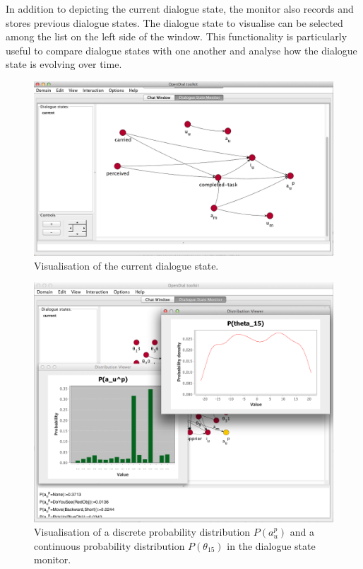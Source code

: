 In addition to depicting the current dialogue state, the monitor also records and stores previous dialogue states.  The dialogue state to visualise can be selected among the list on the left side of the window. This functionality is particularly useful to compare dialogue states with one another and analyse how the dialogue state is evolving over time. 

\begin{figure}[p!] 
\begin{center}
\includegraphics[scale=0.40]{imgs/gui-bn.png}
\end{center} 
\caption{Visualisation of the current dialogue state.}
\label{fig:gui-bn}
\end{figure}

\begin{figure}[p!] 
\begin{center}
\includegraphics[scale=0.40]{imgs/gui-distribviewer.png}
\end{center} 
\caption{Visualisation of a discrete probability distribution $P(a_u^p)$ and a continuous probability distribution $P(\theta_{15})$ in the dialogue state monitor.}
\label{fig:gui-distribviewer}
\end{figure}

